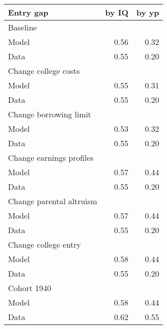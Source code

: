 \begin{tabular}{lrr}
\hline
Entry gap & by IQ  & by yp  \\ 
\hline
Baseline &   &   \\ 
Model & 0.56  & 0.32  \\ 
Data & 0.55  & 0.20  \\ 
Change college costs &   &   \\ 
Model & 0.55  & 0.31  \\ 
Data & 0.55  & 0.20  \\ 
Change borrowing limit &   &   \\ 
Model & 0.53  & 0.32  \\ 
Data & 0.55  & 0.20  \\ 
Change earnings profiles &   &   \\ 
Model & 0.57  & 0.44  \\ 
Data & 0.55  & 0.20  \\ 
Change parental altruism &   &   \\ 
Model & 0.57  & 0.44  \\ 
Data & 0.55  & 0.20  \\ 
Change college entry &   &   \\ 
Model & 0.58  & 0.44  \\ 
Data & 0.55  & 0.20  \\ 
Cohort 1940 &   &   \\ 
Model & 0.58  & 0.44  \\ 
Data & 0.62  & 0.55  \\ 
\hline
\end{tabular}%
